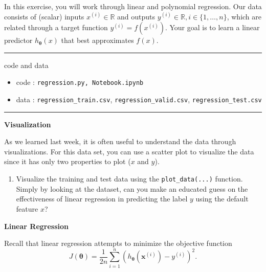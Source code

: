 \documentclass[11pt]{article}
\begin{document}
In this exercise, you will work through linear and polynomial regression. Our data consists of (scalar) inputs $x^{(i)} \in \mathbb{R}$ and outputs $y^{(i)} \in \mathbb{R}, i \in \{1,\ldots, n\}$, which are related through a target function $y^{(i)} = f(x^{(i)})$. Your goal is to learn a linear predictor $h_{\boldsymbol{\theta}}(x)$ that best approximates $f(x)$.

\rule{\textwidth}{1pt}
code and data
\begin{itemize}[nolistsep]
\item code : \verb|regression.py, Notebook.ipynb|
\item data : \verb|regression_train.csv|, \verb|regression_valid.csv|, \verb|regression_test.csv|
\end{itemize}
\vspace{-\baselineskip}
\rule{\textwidth}{1pt}



\vspace{10pt} {\large \textbf{Visualization}}

As we learned last week, it is often useful to understand the data through visualizations. For this data set, you can use a scatter plot to visualize the data since it has only two properties to plot ($x$ and $y$).

\begin{enumerate}

\item  {} Visualize the training and test data using the \verb|plot_data(...)| function. Simply by looking at the dataset, can you make an educated guess on the effectiveness of linear regression in predicting the label $y$ using the default feature $x$?

\end{enumerate}



\vspace{10pt} {\large \textbf{Linear Regression} }

Recall that linear regression attempts to minimize the objective function
\begin{equation*}
J(\boldsymbol{\theta}) = \frac{1}{2n} \sum_{i=1}^{n}{\left(h_{\boldsymbol{\theta}}(\boldsymbol{x}^{(i)}) - y^{(i)}\right)^2}.
\end{equation*}
\end{document}
